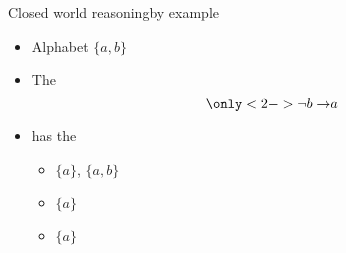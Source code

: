 \begin{frame}{Closed world reasoning}{by example}
  \bigskip
  \begin{itemize}
  \item Alphabet $\{a,b\}$
    \medskip
  \item The 
    \[
      \only<2->{\neg b\to} a
    \]
  \item[] has the
    \par\smallskip
    \begin{itemize}\normalsize
    \item {}         $\{a\}$, $\{a,b\}$
      \smallskip
    \item {} $\{a\}$
      \smallskip
    \item {}  $\{a\}$
    \end{itemize}
  \end{itemize}
\end{frame}
%
